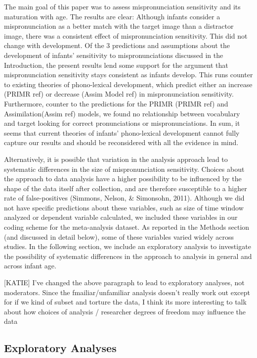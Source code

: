 \documentclass[man]{apa6}
\theoremstyle{definition}
\theoremstyle{definition}
\theoremstyle{definition}
\theoremstyle{remark}
\begin{document}
The main goal of this paper was to assess mispronunciation sensitivity
and its maturation with age. The results are clear: Although infants
consider a mispronunciation as a better match with the target image than
a distractor image, there was a consistent effect of mispronunciation
sensitivity. This did not change with development. Of the 3 predictions
and assumptions about the development of infants' sensitivity to
mispronunciations discussed in the Introduction, the present results
lend some support for the argument that mispronunciation sensitivity
stays consistent as infants develop. This runs counter to existing
theories of phono-lexical development, which predict either an increase
(PRIMR ref) or decrease (Assim Model ref) in mispronunciation
sensitivity. Furthermore, counter to the predictions for the PRIMR
(PRIMR ref) and Assimilation(Assim ref) models, we found no relationship
between vocabulary and target looking for correct pronunciations or
mispronunciations. In sum, it seems that current theories of infants'
phono-lexical development cannot fully capture our results and should be
reconsidered with all the evidence in mind.

Alternatively, it is possible that variation in the analysis approach
lead to systematic differences in the size of mispronunciation
sensitivity. Choices about the approach to data analysis have a higher
possibility to be influenced by the shape of the data itself after
collection, and are therefore susceptible to a higher rate of
false-positives (Simmons, Nelson, \& Simonsohn, 2011). Although we did
not have specific predictions about these variables, such as size of
time window analyzed or dependent variable calculated, we included these
variables in our coding scheme for the meta-analysis dataset. As
reported in the Methods section (and discussed in detail below), some of
these variables varied widely across studies. In the following section,
we include an exploratory analysis to investigate the possibility of
systematic differences in the approach to analysis in general and across
infant age.

{[}KATIE{]} I've changed the above paragraph to lead to exploratory
analyses, not moderators. Since the fmailiar/unfamiliar analysis doesn't
really work out except for if we kind of subset and torture the data, I
think its more interesting to talk about how choices of analysis /
researcher degrees of freedom may influence the data

\subsection{Exploratory Analyses}\label{exploratory-analyses}
\end{document}
